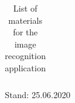 \begin{table}
\begin{longtable}{cp{6.1cm}p{2.5cm}c}
\end{longtable}

Stand: 25.06.2020

  \caption{List of materials for the image recognition application}\label{Anhang:Materialliste}
\end{table}


